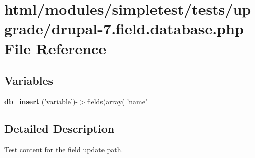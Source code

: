 \hypertarget{drupal-7_8field_8database_8php}{
\section{html/modules/simpletest/tests/upgrade/drupal-\/7.field.database.php File Reference}
\label{drupal-7_8field_8database_8php}
}
\subsection*{Variables}
\begin{DoxyCompactItemize}
\item 
\hypertarget{drupal-7_8field_8database_8php_a51a257eda8e845ff66d95ce2cb455f98}{
{\bfseries db\_\-insert} ('variable')-\/$>$fields(array( 'name'}
\label{drupal-7_8field_8database_8php_a51a257eda8e845ff66d95ce2cb455f98}

\end{DoxyCompactItemize}


\subsection{Detailed Description}
Test content for the field update path. 